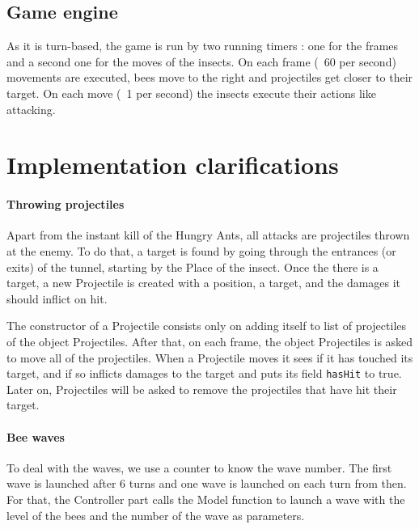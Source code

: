 \documentclass[a4paper]{article}
\begin{document}
	\subsection{Game engine}
	As it is turn-based, the game is run by two running timers : one for the frames and a second one for the moves of the insects. On each frame (~60 per second) movements are executed, bees move to the right and projectiles get closer to their target. On each move (~1 per second) the insects execute their actions like attacking.


\section{Implementation clarifications}

\paragraph{Throwing projectiles} Apart from the instant kill of the Hungry Ants, all attacks are projectiles thrown at the enemy. To do that, a target is found by going through the entrances (or exits) of the tunnel, starting by the Place of the insect. Once the there is a target, a new Projectile is created with a position, a target, and the damages it should inflict on hit.

The constructor of a Projectile consists only on adding itself to list of projectiles of the object Projectiles. After that, on each frame, the object Projectiles is asked to move all of the projectiles. When a Projectile moves it sees if it has touched its target, and if so inflicts damages to the target and puts its field \texttt{hasHit} to true. Later on, Projectiles will be asked to remove the projectiles that have hit their target. 


\paragraph{Bee waves} To deal with the waves, we use a counter to know the wave number. The first wave is launched after 6 turns and one wave is launched on each turn from then. For that, the Controller part calls the Model function to launch a wave with the level of the bees and the number of the wave as parameters.
\end{document}
